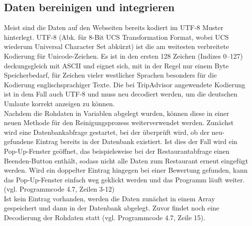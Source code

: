 \documentclass[a4paper,oneside,12pt]{report}
\begin{document}
			\subsection{Daten bereinigen und integrieren}
				
				Meist sind die Daten auf den Webseiten bereits kodiert im UTF-8 Muster hinterlegt. UTF-8 (Abk. für 8-Bit UCS Transformation Format, wobei UCS wiederum Universal Character Set abkürzt) ist die am weitesten verbreitete Kodierung für Unicode-Zeichen. Es ist in den ersten 128 Zeichen (Indizes 0–127) deckungsgleich mit ASCII und eignet sich, mit in der Regel nur einem Byte Speicherbedarf, für Zeichen vieler westlicher Sprachen besonders für die Kodierung englischsprachiger Texte. \cite{bib-utf8} Die bei TripAdvisor angewendete Kodierung ist in dem Fall auch UTF-8 und muss neu decodiert werden, um die deutschen Umlaute korrekt anzeigen zu können.
				\\
				Nachdem die Rohdaten in Variablen abgelegt wurden, können diese in einer neuen Methode für den Reinigungsprozess weiterverwendet werden. Zunächst wird eine Datenbankabfrage gestartet, bei der überprüft wird, ob der neu-gefundene Eintrag bereits in der Datenbank existiert. Ist dies der Fall wird ein Pop-Up-Fenster geöffnet, das beispielsweise bei der Restaurantabfrage einen Beenden-Button enthält, sodass nicht alle Daten zum Restaurant erneut eingefügt werden. Wird ein doppelter Eintrag hingegen bei einer Bewertung gefunden, kann das Pop-Up-Fenster einfach weg geklickt werden und das Programm läuft weiter. (vgl. Programmcode 4.7, Zeilen 3-12)
				\\
				Ist kein Eintrag vorhanden, werden die Daten zunächst in einem Array gespeichert und dann in der Datenbank abgelegt. Zuvor findet noch eine Decodierung der Rohdaten statt (vgl. Programmcode 4.7, Zeile 15).
				\\			
\end{document}
